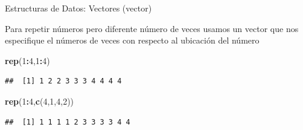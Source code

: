 \documentclass[ignorenonframetext,]{beamer}
\newenvironment{Shaded}{\begin{snugshade}}{\end{snugshade}}
\newcommand{\KeywordTok}[1]{\textcolor[rgb]{0.13,0.29,0.53}{\textbf{#1}}}
\newcommand{\DecValTok}[1]{\textcolor[rgb]{0.00,0.00,0.81}{#1}}
\newcommand{\OperatorTok}[1]{\textcolor[rgb]{0.81,0.36,0.00}{\textbf{#1}}}
\newcommand{\NormalTok}[1]{#1}
\begin{document}
\begin{frame}[fragile]{Estructuras de Datos: Vectores (vector)}

Para repetir números pero diferente número de veces usamos un vector que
nos especifique el números de veces con respecto al ubicación del número

\begin{Shaded}
\begin{Highlighting}[]
\KeywordTok{rep}\NormalTok{(}\DecValTok{1}\OperatorTok{:}\DecValTok{4}\NormalTok{,}\DecValTok{1}\OperatorTok{:}\DecValTok{4}\NormalTok{)}
\end{Highlighting}
\end{Shaded}

\begin{verbatim}
##  [1] 1 2 2 3 3 3 4 4 4 4
\end{verbatim}

\begin{Shaded}
\begin{Highlighting}[]
\KeywordTok{rep}\NormalTok{(}\DecValTok{1}\OperatorTok{:}\DecValTok{4}\NormalTok{,}\KeywordTok{c}\NormalTok{(}\DecValTok{4}\NormalTok{,}\DecValTok{1}\NormalTok{,}\DecValTok{4}\NormalTok{,}\DecValTok{2}\NormalTok{))}
\end{Highlighting}
\end{Shaded}

\begin{verbatim}
##  [1] 1 1 1 1 2 3 3 3 3 4 4
\end{verbatim}

\end{frame}
\end{document}
